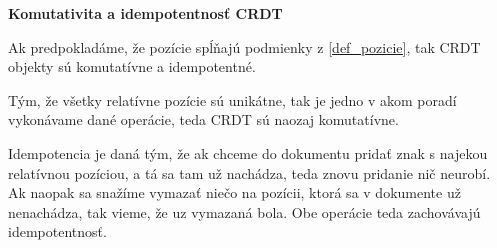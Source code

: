 \begin{flushleft}\textbf {Komutativita a idempotentnosť CRDT}\end{flushleft}
Ak predpokladáme, že pozície spĺňajú podmienky z \ref{def_pozicie}, tak CRDT objekty sú
komutatívne a idempotentné. 

Tým, že všetky relatívne pozície sú unikátne, tak je jedno v akom poradí vykonávame dané operácie,
teda CRDT sú naozaj komutatívne.

Idempotencia je daná tým, že ak chceme do dokumentu pridať znak s najekou relatívnou pozíciou, a tá
sa tam už nachádza, teda znovu pridanie nič neurobí. Ak naopak sa snažíme vymazať niečo na
pozícii, ktorá sa v dokumente už nenachádza, tak vieme, že uz vymazaná bola. Obe operácie teda
zachovávajú idempotentnosť.
\cite{nuno_preguica}

